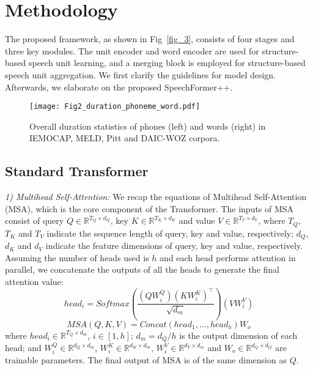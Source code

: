 \documentclass[lettersize,journal]{IEEEtran}
\begin{document}
\section{Methodology}
The proposed framework, as shown in Fig~\ref{fig_3}, consists of four stages and three key modules. The unit encoder and word encoder are used for structure-based speech unit learning, and a merging block is employed for structure-based speech unit aggregation. We first clarify the guidelines for model design. Afterwards, we elaborate on the proposed SpeechFormer++.

\begin{figure}[t]
\centering
\texttt{[image: Fig2\_duration\_phoneme\_word.pdf]}
\caption{Overall duration statistics of phones (left) and words (right) in IEMOCAP, MELD, Pitt and DAIC-WOZ corpora.}
\label{fig_2}
\end{figure}

\iffalse
\subsection{Standard Transformer}

\textit{1) Multihead Self-Attention:} We recap the equations of Multihead Self-Attention (MSA), which is the core component of the Transformer. The inputs of MSA consist of query $Q \in \mathbb{R}^{T_Q \times d_Q}$, key $K \in \mathbb{R}^{T_K \times d_K}$ and value $V \in \mathbb{R}^{T_V \times d_V}$, where $T_Q$, $T_K$ and $T_V$ indicate the sequence length of query, key and value, respectively; $d_Q$, $d_K$ and $d_V$ indicate the feature dimensions of query, key and value, respectively. Assuming the number of heads used is $h$ and each head performs attention in parallel, we concatenate the outputs of all the heads to generate the final attention value:
\begin{equation}
head_i = Softmax\left(\frac{(QW_i^Q){(KW_i^K)}^{\top}}{\sqrt{d_{m}}}\right){(VW_i^V)}
\label{eq1}
\end{equation}
\begin{equation}
MSA(Q, K, V) = Concat(head_1, \dots, head_h)W_o
\label{eq2}
\end{equation}
where $head_i \in \mathbb{R}^{T_Q \times d_m}$, $i \in [1, h]$; $d_m = d_Q / h$ is the output dimension of each head; and $W_i^Q \in \mathbb{R}^{d_Q \times d_m}$, $W_i^K \in \mathbb{R}^{d_K \times d_m}$, $W_i^V \in \mathbb{R}^{d_V \times d_m}$ and $W_o \in \mathbb{R}^{d_Q \times d_Q}$ are trainable parameters. The final output of MSA is of the same dimension as $Q$.
\end{document}
